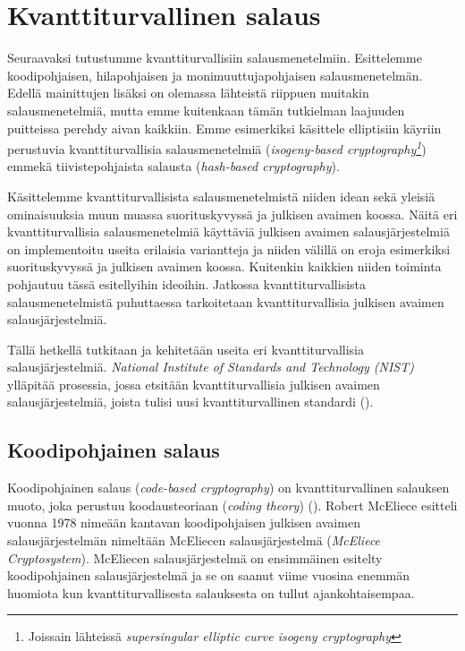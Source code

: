 \chapter{Kvanttiturvallinen salaus\label{results}}
Seuraavaksi tutustumme kvanttiturvallisiin salausmenetelmiin. Esittelemme koodipohjaisen, hilapohjaisen ja monimuuttujapohjaisen salausmenetelmän. Edellä mainittujen lisäksi on olemassa lähteistä riippuen muitakin salausmenetelmiä, mutta emme kuitenkaan tämän tutkielman laajuuden puitteissa perehdy aivan kaikkiin. Emme esimerkiksi käsittele elliptisiin käyriin perustuvia kvanttiturvallisia salausmenetelmiä (\emph{isogeny-based cryptography\footnote{Joissain lähteissä \emph{supersingular elliptic curve isogeny cryptography}}}) emmekä tiivistepohjaista salausta (\emph{hash-based cryptography}).

Käsittelemme kvanttiturvallisista salausmenetelmistä niiden idean sekä yleisiä ominaisuuksia muun muassa suorituskyvyssä ja julkisen avaimen koossa. Näitä eri kvanttiturvallisia salausmenetelmiä käyttäviä julkisen avaimen salausjärjestelmiä on implementoitu useita erilaisia variantteja ja niiden välillä on eroja esimerkiksi suorituskyvyssä ja julkisen avaimen koossa. Kuitenkin kaikkien niiden toiminta pohjautuu tässä esitellyihin ideoihin. Jatkossa kvanttiturvallisista salausmenetelmistä puhuttaessa tarkoitetaan kvanttiturvallisia julkisen avaimen salausjärjestelmiä.

Tällä hetkellä tutkitaan ja kehitetään useita eri kvanttiturvallisia salausjärjestelmiä. \emph{National Institute of Standards and Technology (NIST)} ylläpitää prosessia, jossa etsitään kvanttiturvallisia julkisen avaimen salausjärjestelmiä, joista tulisi uusi kvanttiturvallinen standardi (\cite{alagic2020status}).

\section{Koodipohjainen salaus}
Koodipohjainen salaus (\emph{code-based cryptography}) on kvanttiturvallinen salauksen muoto, joka perustuu koodausteoriaan (\emph{coding theory}) (\cite{repka2014overview}). Robert McEliece esitteli vuonna 1978 nimeään kantavan koodipohjaisen julkisen avaimen salausjärjestelmän nimeltään McEliecen salausjärjestelmä (\emph{McEliece Cryptosystem}). McEliecen salausjärjestelmä on ensimmäinen esitelty koodipohjainen salausjärjestelmä ja se on saanut viime vuosina enemmän huomiota kun kvanttiturvallisesta salauksesta on tullut ajankohtaisempaa.

